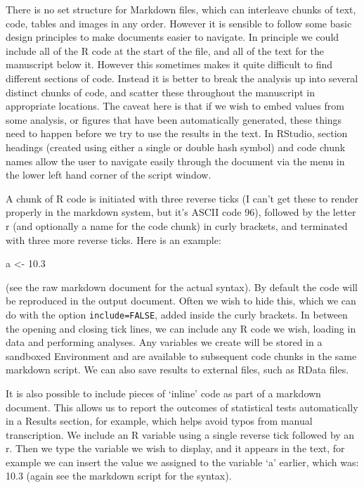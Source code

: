 \documentclass[
]{article}
\newenvironment{Shaded}{\begin{snugshade}}{\end{snugshade}}
\newcommand{\FloatTok}[1]{\textcolor[rgb]{0.00,0.00,0.81}{#1}}
\newcommand{\NormalTok}[1]{#1}
\newcommand{\OtherTok}[1]{\textcolor[rgb]{0.56,0.35,0.01}{#1}}
\begin{document}
There is no set structure for Markdown files, which can interleave chunks of text, code, tables and images in any order. However it is sensible to follow some basic design principles to make documents easier to navigate. In principle we could include all of the R code at the start of the file, and all of the text for the manuscript below it. However this sometimes makes it quite difficult to find different sections of code. Instead it is better to break the analysis up into several distinct chunks of code, and scatter these throughout the manuscript in appropriate locations. The caveat here is that if we wish to embed values from some analysis, or figures that have been automatically generated, these things need to happen before we try to use the results in the text. In RStudio, section headings (created using either a single or double hash symbol) and code chunk names allow the user to navigate easily through the document via the menu in the lower left hand corner of the script window.

A chunk of R code is initiated with three reverse ticks (I can't get these to render properly in the markdown system, but it's ASCII code 96), followed by the letter r (and optionally a name for the code chunk) in curly brackets, and terminated with three more reverse ticks. Here is an example:

\begin{Shaded}
\begin{Highlighting}[]
\NormalTok{a }\OtherTok{\textless{}{-}} \FloatTok{10.3}
\end{Highlighting}
\end{Shaded}

(see the raw markdown document for the actual syntax). By default the code will be reproduced in the output document. Often we wish to hide this, which we can do with the option \texttt{include=FALSE}, added inside the curly brackets. In between the opening and closing tick lines, we can include any R code we wish, loading in data and performing analyses. Any variables we create will be stored in a sandboxed Environment and are available to subsequent code chunks in the same markdown script. We can also save results to external files, such as RData files.

It is also possible to include pieces of `inline' code as part of a markdown document. This allows us to report the outcomes of statistical tests automatically in a Results section, for example, which helps avoid typos from manual transcription. We include an R variable using a single reverse tick followed by an r. Then we type the variable we wish to display, and it appears in the text, for example we can insert the value we assigned to the variable `a' earlier, which was: 10.3 (again see the markdown script for the syntax).
\end{document}
